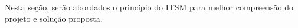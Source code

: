 Nesta seção, serão abordados o princípio do ITSM para melhor compreensão do projeto e solução proposta.











